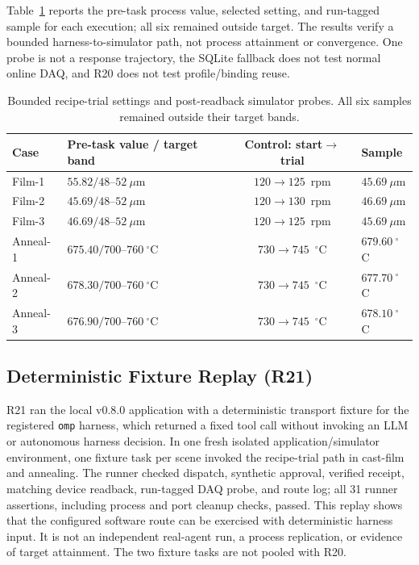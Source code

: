 Table~\ref{tab:q8} reports the pre-task process value, selected setting, and
run-tagged sample for each execution; all six remained outside target. The
results verify a bounded harness-to-simulator path, not process attainment or
convergence. One probe is not a response trajectory, the SQLite fallback does
not test normal online DAQ, and R20 does not test profile/binding reuse.

\begin{table}[!t]
\centering
\caption{Bounded recipe-trial settings and post-readback simulator probes. All
six samples remained outside their target bands.}
\label{tab:q8}
\footnotesize
\setlength{\tabcolsep}{2.5pt}
\begin{tabularx}{\columnwidth}{@{}lXcX@{}}
\toprule
Case & Pre-task value / target band & Control: start$\to$trial & Sample \\
\midrule
Film-1 & $55.82/48$--$52~\mu$m & $120\to125$~rpm & $45.69~\mu$m \\
Film-2 & $45.69/48$--$52~\mu$m & $120\to130$~rpm & $46.69~\mu$m \\
Film-3 & $46.69/48$--$52~\mu$m & $120\to125$~rpm & $45.69~\mu$m \\
Anneal-1 & $675.40/700$--$760~^{\circ}$C & $730\to745$~$^{\circ}$C & $679.60~^{\circ}$C \\
Anneal-2 & $678.30/700$--$760~^{\circ}$C & $730\to745$~$^{\circ}$C & $677.70~^{\circ}$C \\
Anneal-3 & $676.90/700$--$760~^{\circ}$C & $730\to745$~$^{\circ}$C & $678.10~^{\circ}$C \\
\bottomrule
\end{tabularx}
\end{table}

\subsection{Deterministic Fixture Replay (R21)}
R21 ran the local v0.8.0 application with a deterministic transport fixture
for the registered \texttt{omp} harness,
which returned a fixed tool call without invoking an LLM or autonomous harness
decision. In one fresh isolated application/simulator environment, one fixture
task per scene invoked the recipe-trial path in cast-film and annealing. The
runner checked dispatch, synthetic approval, verified receipt, matching device
readback, run-tagged DAQ probe, and route log; all 31 runner assertions,
including process and port cleanup checks, passed. This replay shows that the
configured software route can be exercised with deterministic harness input.
It is not an independent real-agent run, a process replication, or evidence of
target attainment. The two fixture tasks are not pooled with R20.

